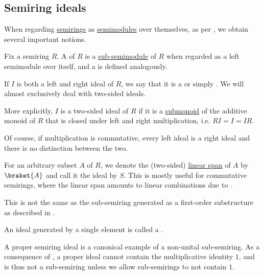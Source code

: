 \subsection{Semiring ideals}\label{subsec:semiring_ideals}

When regarding \hyperref[def:semiring]{semirings} as \hyperref[def:semimodule]{semimodules} over themselves, as per , we obtain several important notions.

\begin{definition}\label{def:semiring_ideal}\mimprovised
  Fix a semiring \( R \). A  of \( R \) is a \hyperref[def:semimodule/submodel]{sub-semimodule} of \( R \) when regarded as a left semimodule over itself, and a  is defined analogously.

  If \( I \) is both a left and right ideal of \( R \), we say that it is a  or simply . We will almost exclusively deal with two-sided ideals.

  More explicitly, \( I \) is a two-sided ideal of \( R \) if it is a \hyperref[def:monoid/submodel]{submonoid} of the additive monoid of \( R \) that is closed under left and right multiplication, i.e. \( RI = I = IR \).

  Of course, if multiplication is commutative, every left ideal is a right ideal and there is no distinction between the two.

  \begin{thmenum}
     For an arbitrary subset \( A \) of \( R \), we denote the (two-sided) \hyperref[def:semimodule/submodel]{linear span} of \( A \) by \( \braket{ A } \) and call it the ideal  by \( S \). This is mostly useful for commutative semirings, where the linear span amounts to linear combinations due to .

    This is not the same as the sub-semiring generated as a first-order substructure as described in .

     An ideal generated by a single element is called a .
  \end{thmenum}
\end{definition}

\begin{remark}\label{rem:semiring_ideal_as_sub_semiring}
  A proper semiring ideal is a canonical example of a non-unital sub-semiring. As a consequence of , a proper ideal cannot contain the multiplicative identity \( 1 \), and is thus not a sub-semiring unless we allow sub-semirings to not contain \( 1 \).
\end{remark}

